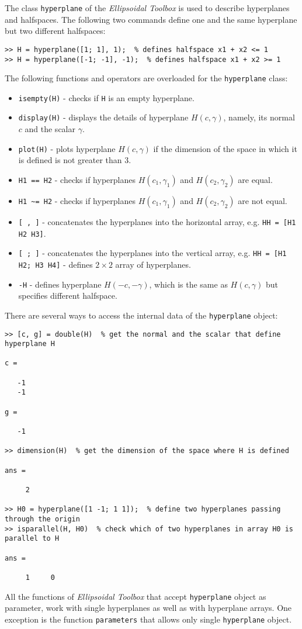 The class {\tt hyperplane} of the {\it Ellipsoidal Toolbox} is used
to describe hyperplanes and halfspaces. The following two commands
define one and the same hyperplane but two different halfspaces:
{\tt \begin{verbatim}
>> H = hyperplane([1; 1], 1);  % defines halfspace x1 + x2 <= 1
>> H = hyperplane([-1; -1], -1);  % defines halfspace x1 + x2 >= 1
\end{verbatim} }
The following functions and operators are overloaded for the
{\tt hyperplane} class:
\begin{itemize}
\item {\tt isempty(H)} - checks if {\tt H} is an empty hyperplane.
\item {\tt display(H)} - displays the details of hyperplane $H(c,\gamma)$,
namely, its normal $c$ and the scalar $\gamma$.
\item {\tt plot(H)} - plots hyperplane $H(c,\gamma)$ if the dimension of the
space in which it is defined  is not greater than 3.
\item {\tt H1 == H2} - checks if hyperplanes $H(c_1,\gamma_1)$ and
$H(c_2,\gamma_2)$ are equal.
\item {\tt H1 \~{ }= H2} - checks if hyperplanes $H(c_1,\gamma_1)$ and
$H(c_2,\gamma_2)$ are not equal.
\item {\tt [ , ]} - concatenates the hyperplanes into the horizontal array, e.g.
{\tt HH = [H1 H2 H3]}.
\item {\tt [ ; ]} - concatenates the hyperplanes into the vertical array, e.g.
{\tt HH = [H1 H2; H3 H4]} - defines $2\times 2$ array of hyperplanes.
\item {\tt -H} - defines hyperplane $H(-c,-\gamma)$, which is the same
as $H(c,\gamma)$ but specifies different halfspace.
\end{itemize}
There are several ways to access the internal data of the {\tt hyperplane}
object:
{\tt \begin{verbatim}
>> [c, g] = double(H)  % get the normal and the scalar that define hyperplane H

c =

   -1
   -1

g =

   -1

>> dimension(H)  % get the dimension of the space where H is defined

ans =

     2

>> H0 = hyperplane([1 -1; 1 1]);  % define two hyperplanes passing through the origin
>> isparallel(H, H0)  % check which of two hyperplanes in array H0 is parallel to H

ans =

     1     0
\end{verbatim} }
All the functions of {\it Ellipsoidal Toolbox} that accept {\tt hyperplane}
object as parameter, work with single hyperplanes as well as with hyperplane
arrays. One exception is the function {\tt parameters} that allows only
single {\tt hyperplane} object.

